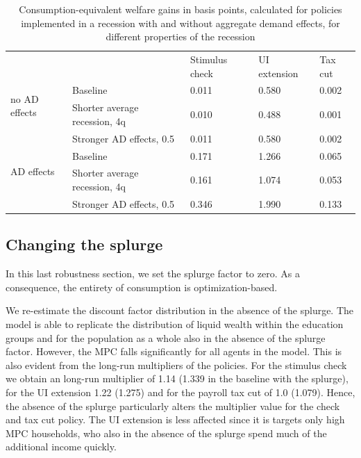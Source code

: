 \documentclass[\econtexRoot/HAFiscal]{subfiles}
\begin{document}
\begin{table}[]
  \begin{center}
    \begin{tabular}{@{}lllll@{}}
      \toprule
      &                    											& Stimulus check & UI extension & Tax cut 	\\ \cmidrule(l){1-5}
      \multirow{2}{*}{no AD effects} 					& Baseline 						& 0.011          & 0.580        & 0.002   	\\ 
      & Shorter average recession, 4q & 0.010          & 0.488        & 0.001  	\\
      & Stronger AD effects, 0.5 		& 0.011          & 0.580        & 0.002   	\\ \cmidrule(l){1-5}
      \multirow{2}{*}{AD effects}						& Baseline    					& 0.171          & 1.266        & 0.065   	\\
      & Shorter average recession, 4q & 0.161          & 1.074        & 0.053   	\\
      & Stronger AD effects, 0.5    	& 0.346          & 1.990        & 0.133   	\\ \cmidrule(l){1-5} 
    \end{tabular}
    \caption{Consumption-equivalent welfare gains in basis points, calculated for policies implemented in a recession with and without aggregate demand effects, for different properties of the recession}
    \notinsubfile{\label{tab:robustness_recession_property_results}}
  \end{center}
\end{table}


\FloatBarrier
\hypertarget{changing-the-splurge}{}\par\subsection{Changing the splurge}

In this last robustness section, we set the splurge factor to zero. As a consequence, the entirety of consumption is optimization-based.

We re-estimate the discount factor distribution in the absence of the splurge. The model is able to replicate the distribution of liquid wealth within the education groups and for the population as a whole also in the absence of the splurge factor. However, the MPC falls significantly for all agents in the model. This is also evident from the long-run multipliers of the policies. For the stimulus check we obtain an long-run multiplier of 1.14 (1.339 in the baseline with the splurge), for the UI extension 1.22 (1.275) and for the payroll tax cut of 1.0 (1.079). Hence, the absence of the splurge particularly alters the multiplier value for the check and tax cut policy. The UI extension is less affected since it is targets only high MPC households, who also in the absence of the splurge spend much of the additional income quickly. 
\end{document}

